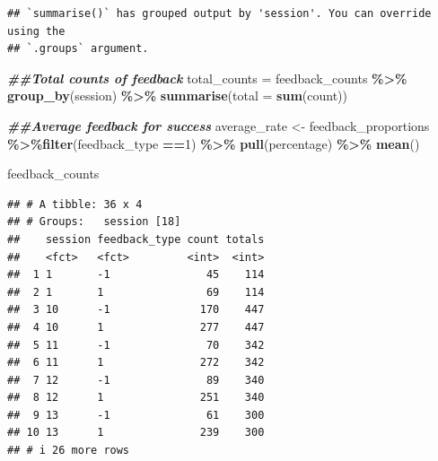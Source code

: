 \documentclass[
]{article}
\newenvironment{Shaded}{\begin{snugshade}}{\end{snugshade}}
\newcommand{\AttributeTok}[1]{\textcolor[rgb]{0.13,0.29,0.53}{#1}}
\newcommand{\DecValTok}[1]{\textcolor[rgb]{0.00,0.00,0.81}{#1}}
\newcommand{\DocumentationTok}[1]{\textcolor[rgb]{0.56,0.35,0.01}{\textbf{\textit{#1}}}}
\newcommand{\FunctionTok}[1]{\textcolor[rgb]{0.13,0.29,0.53}{\textbf{#1}}}
\newcommand{\NormalTok}[1]{#1}
\newcommand{\OtherTok}[1]{\textcolor[rgb]{0.56,0.35,0.01}{#1}}
\newcommand{\SpecialCharTok}[1]{\textcolor[rgb]{0.81,0.36,0.00}{\textbf{#1}}}
\begin{document}
\begin{verbatim}
## `summarise()` has grouped output by 'session'. You can override using the
## `.groups` argument.
\end{verbatim}

\begin{Shaded}
\begin{Highlighting}[]
\DocumentationTok{\#\#Total counts of feedback}
\NormalTok{total\_counts }\OtherTok{=}\NormalTok{ feedback\_counts }\SpecialCharTok{\%\textgreater{}\%} \FunctionTok{group\_by}\NormalTok{(session) }\SpecialCharTok{\%\textgreater{}\%} \FunctionTok{summarise}\NormalTok{(}\AttributeTok{total =} \FunctionTok{sum}\NormalTok{(count))}

\DocumentationTok{\#\#Average feedback for success}
\NormalTok{average\_rate }\OtherTok{\textless{}{-}}\NormalTok{ feedback\_proportions }\SpecialCharTok{\%\textgreater{}\%}\FunctionTok{filter}\NormalTok{(feedback\_type }\SpecialCharTok{==}\DecValTok{1}\NormalTok{) }\SpecialCharTok{\%\textgreater{}\%} \FunctionTok{pull}\NormalTok{(percentage) }\SpecialCharTok{\%\textgreater{}\%} \FunctionTok{mean}\NormalTok{()}



\NormalTok{feedback\_counts }
\end{Highlighting}
\end{Shaded}

\begin{verbatim}
## # A tibble: 36 x 4
## # Groups:   session [18]
##    session feedback_type count totals
##    <fct>   <fct>         <int>  <int>
##  1 1       -1               45    114
##  2 1       1                69    114
##  3 10      -1              170    447
##  4 10      1               277    447
##  5 11      -1               70    342
##  6 11      1               272    342
##  7 12      -1               89    340
##  8 12      1               251    340
##  9 13      -1               61    300
## 10 13      1               239    300
## # i 26 more rows
\end{verbatim}
\end{document}
